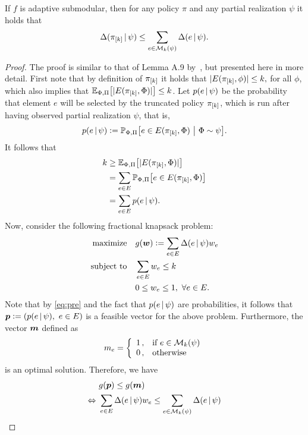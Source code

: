 \begin{lemma}\label{lem:mon_subm}
  If $f$ is adaptive submodular, then for any policy $\pi$ and any partial realization $\psi$ it holds that
  \begin{align*}
    \Delta(\pi_{[k]}\,\vert\,\psi) \leq \sum_{e \in \mathcal{M}_k(\psi)} \Delta(e\,\vert\,\psi).
  \end{align*}
\end{lemma}
\begin{proof}
  The proof is similar to that of Lemma A.9 by~\citet{golovin11}, but presented here in more detail.
  First note that by definition of $\pi_{[k]}$ it holds that $|E(\pi_{[k]}, \phi)| \leq k,$ for all $\phi$, which also implies that $\E[\Phi,\Pi]{|E(\pik, \Phi)|} \leq k$.
  Let $p(e\,\vert\,\psi)$ be the probability that element $e$ will be selected by the truncated policy $\pi_{[k]}$, which is run after having observed partial realization $\psi$, that is,
  \begin{align*}
    p(e\mmid\psi) \defeq \P[\Phi,\Pi]{e \in E(\pik, \Phi)}[\Phi \sim \psi].
  \end{align*}
  It follows that
  \begin{align}
    \label{eq:pre}
    \begin{split}
      k &\geq \E[\Phi, \Pi]{|E(\pik, \Phi)|}\\
        &= \sum_{e \in E}\P[\Phi,\Pi]{e \in E(\pik, \Phi)}\\
        &= \sum_{e \in E}p(e\mmid\psi).
    \end{split}
  \end{align}
  Now, consider the following fractional knapsack problem:
  \begin{align*}
    \textrm{maximize} & \quad g(\bm{w}) \vcentcolon= \sum_{e \in E}\Delta(e\,\vert\,\psi)w_e\\
    \textrm{subject to} & \quad \sum_{e \in E}w_e \leq k\\
               & \quad 0 \leq w_e \leq 1,\ \forall e \in E.
  \end{align*}
  Note that by \eqref{eq:pre} and the fact that $p(e\,\vert\,\psi)$ are probabilities, it follows that $\*p \defeq \left(p(e\mmid\psi),\ e \in E\right)$ is a feasible vector for the above problem.
  Furthermore, the vector $\bm{m}$ defined as
  \begin{align*}
    m_e = \twopartdefo{1}{e \in \mathcal{M}_k(\psi)}{0}
  \end{align*}
  is an optimal solution. 
  Therefore, we have
  \begin{align}\label{eq:knap}
                    &\ g(\bm{p}) \leq g(\bm{m}) \notag\\
    \Leftrightarrow &\ \sum_{e \in E}\Delta(e\,\vert\,\psi)w_e \leq \sum_{e \in \mathcal{M}_k(\psi)} \Delta(e\,\vert\,\psi)
  \end{align}
  

\end{proof}

